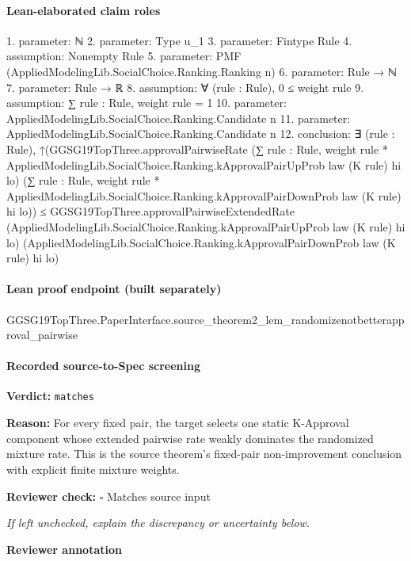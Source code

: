 \documentclass[10pt]{article}
\newcommand{\reviewerbox}{%
  \par\noindent\fbox{\parbox{0.96\linewidth}{\rule{0pt}{0.38in}}}\par
}
\newcommand{\reviewmatch}[1]{%
  \par\noindent\textbf{Reviewer check:} $\square$\; #1\par
  \noindent\emph{If left unchecked, explain the discrepancy or uncertainty below.}\par
}
\begin{document}
\paragraph{Lean-elaborated claim roles}\begin{ReviewVerbatim}
1. parameter: ℕ
2. parameter: Type u_1
3. parameter: Fintype Rule
4. assumption: Nonempty Rule
5. parameter: PMF (AppliedModelingLib.SocialChoice.Ranking.Ranking n)
6. parameter: Rule → ℕ
7. parameter: Rule → ℝ
8. assumption: ∀ (rule : Rule), 0 ≤ weight rule
9. assumption: ∑ rule : Rule, weight rule = 1
10. parameter: AppliedModelingLib.SocialChoice.Ranking.Candidate n
11. parameter: AppliedModelingLib.SocialChoice.Ranking.Candidate n
12. conclusion: ∃ (rule : Rule),
  ↑(GGSG19TopThree.approvalPairwiseRate
        (∑ rule : Rule, weight rule * AppliedModelingLib.SocialChoice.Ranking.kApprovalPairUpProb law (K rule) hi lo)
        (∑ rule : Rule,
          weight rule * AppliedModelingLib.SocialChoice.Ranking.kApprovalPairDownProb law (K rule) hi lo)) ≤
    GGSG19TopThree.approvalPairwiseExtendedRate
      (AppliedModelingLib.SocialChoice.Ranking.kApprovalPairUpProb law (K rule) hi lo)
      (AppliedModelingLib.SocialChoice.Ranking.kApprovalPairDownProb law (K rule) hi lo)
\end{ReviewVerbatim}

\paragraph{Lean proof endpoint (built separately)}\begin{ReviewVerbatim}
GGSG19TopThree.PaperInterface.source_theorem2_lem_randomizenotbetterapproval_pairwise
\end{ReviewVerbatim}

\paragraph{Recorded source-to-Spec screening}
\textbf{Verdict:} \texttt{matches}
\\
{\raggedright
\textbf{Reason:} For every fixed pair, the target selects one static K-\allowbreak{}Approval component whose extended pairwise rate weakly dominates the randomized mixture rate.\allowbreak{} This is the source theorem's fixed-\allowbreak{}pair non-\allowbreak{}improvement conclusion with explicit finite mixture weights.\allowbreak{}
\par}
\reviewmatch{Matches source input}
\noindent\textbf{Reviewer annotation}\par
\reviewerbox
\clearpage
\hypertarget{source-claim-c1058349a9163721}{}
\end{document}
